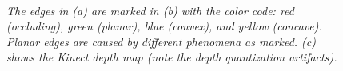 \begin{figure}[t]
\centering
        \hfill
        \hfill
        \\
\caption{\it The edges in (a) are marked in (b) with the color code: red (occluding), green (planar),
blue (convex), and yellow (concave). Planar edges are caused by different phenomena as marked.
(c) shows the Kinect depth map (note the depth quantization artifacts).}
\label{fig:EdgeLabeling}
\end{figure}

\noindent


